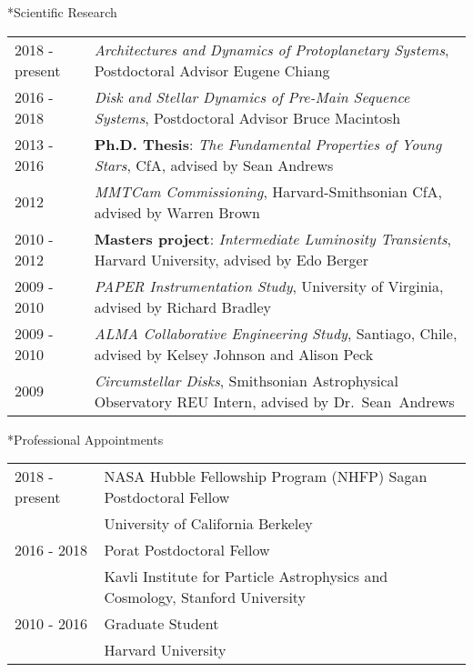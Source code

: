 \documentclass[10pt]{article}
\makeatletter
\renewcommand{\section}{\@startsection{section}{1}{0pt}{-\baselineskip}{0.5\baselineskip}{\scshape\color{myblue1}}}
\makeatother
\begin{document}
\section*{Scientific Research}
\begin{tabular*}{\textwidth}{@{\hspace{10pt}}p{1in}l}
2018 - present & \emph{Architectures and Dynamics of Protoplanetary Systems}, Postdoctoral Advisor Eugene Chiang \\
2016 - 2018 & \emph{Disk and Stellar Dynamics of Pre-Main Sequence Systems}, Postdoctoral Advisor Bruce Macintosh \\
2013 - 2016 & \textbf{Ph.D. Thesis}: \emph{The Fundamental Properties of Young Stars}, CfA, advised by Sean Andrews\\
2012 & \emph{MMTCam Commissioning}, Harvard-Smithsonian CfA, advised by Warren Brown\\
2010 - 2012 & \textbf{Masters project}: \emph{Intermediate Luminosity Transients}, Harvard University, advised by Edo Berger\\
2009 - 2010 & \emph{PAPER Instrumentation Study}, University of Virginia, advised by Richard Bradley\\
2009 - 2010 & \emph{ALMA Collaborative Engineering Study}, Santiago, Chile, advised by Kelsey Johnson and Alison Peck\\
2009 & \emph{Circumstellar Disks}, Smithsonian Astrophysical Observatory REU Intern, advised by Dr.~Sean~Andrews\\
\end{tabular*}

\section*{Professional Appointments}
\begin{tabular*}{\textwidth}{@{\hspace{10pt}}p{1in}l}
2018 - present & NASA Hubble Fellowship Program (NHFP) Sagan Postdoctoral Fellow\\
 & University of California Berkeley\\
2016 - 2018 & Porat Postdoctoral Fellow\\
 & Kavli Institute for Particle Astrophysics and Cosmology, Stanford University \\
2010 - 2016 & Graduate Student \\
 & Harvard University\\
\end{tabular*}
\end{document}
